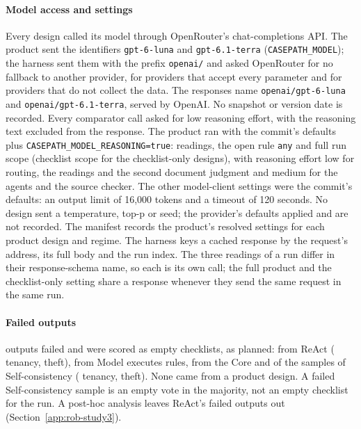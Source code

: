 \paragraph{Model access and settings}
Every design called its model through OpenRouter's chat-completions API. The product sent the identifiers \texttt{gpt-6-luna} and \texttt{gpt-6.1-terra} (\texttt{CASEPATH\_\allowbreak{}MODEL}); the harness sent them with the prefix \texttt{openai/} and asked OpenRouter for no fallback to another provider, for providers that accept every parameter and for providers that do not collect the data. The responses name \texttt{openai/\allowbreak{}gpt-6-luna} and \texttt{openai/\allowbreak{}gpt-6.1-terra}, served by OpenAI. No snapshot or version date is recorded. Every comparator call asked for low reasoning effort, with the reasoning text excluded from the response. The product ran with the commit's defaults plus \texttt{CASEPATH\_\allowbreak{}MODEL\_\allowbreak{}REASONING=true}: \sthreeReadings{} readings, the open rule \texttt{any} and full run scope (checklist scope for the checklist-only designs), with reasoning effort low for routing, the readings and the second document judgment and medium for the agents and the source checker. The other model-client settings were the commit's defaults: an output limit of 16,000 tokens and a timeout of 120 seconds. No design sent a temperature, top-p or seed; the provider's defaults applied and are not recorded. The manifest records the product's resolved settings for each product design and regime. The harness keys a cached response by the request's address, its full body and the run index. The three readings of a run differ in their response-schema name, so each is its own call; the full product and the checklist-only setting share a response whenever they send the same request in the same run.

\paragraph{Failed outputs}
\sthreeRunFailedOutputs{} outputs failed and were scored as empty checklists, as planned: \sthreeRunFailedReact{} from ReAct (\sthreeReactTenFailed{} tenancy, \sthreeReactThFailed{} theft), \sthreeRunFailedMer{} from Model executes rules, \sthreeRunFailedCore{} from the Core and \sthreeRunFailedSelfCons{} of the samples of Self-consistency (\sthreeRunFailedSelfConsSamplesTen{} tenancy, \sthreeRunFailedSelfConsSamplesTh{} theft). None came from a product design. A failed Self-consistency sample is an empty vote in the majority, not an empty checklist for the run. A post-hoc analysis leaves ReAct's failed outputs out (Section~\ref{app:rob-study3}).

